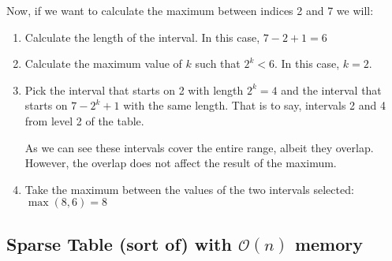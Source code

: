 \begin{figure}[h!]
\end{figure}

\noindent
Now, if we want to calculate the maximum between indices 2 and 7 we will:
\begin{enumerate}
		\setlength{\itemsep}{2pt}
		\item Calculate the length of the interval. In this case, $7-2+1=6$
		\item Calculate the maximum value of $k$  such that $2^k<6$. In this
				case, $k=2$.
		\item Pick the interval that starts on 2 with length $2^k=4$ and the
				interval that starts on $7-2^k+1$ with the same length. 
				That is to say, intervals 2 and 4 from level 2 of the table.

				As we can see these intervals cover the entire range, albeit 
				they overlap. However, the overlap does not affect the result
				of the maximum.
		\item Take the maximum between the values of the two intervals 
				selected: $\max(8,6)=8$
\end{enumerate}

\newpage
{}
\newpage

\subsection{Sparse Table {\scriptsize(sort of)} with \boldmath$\mathcal{O}(n)$ memory}

